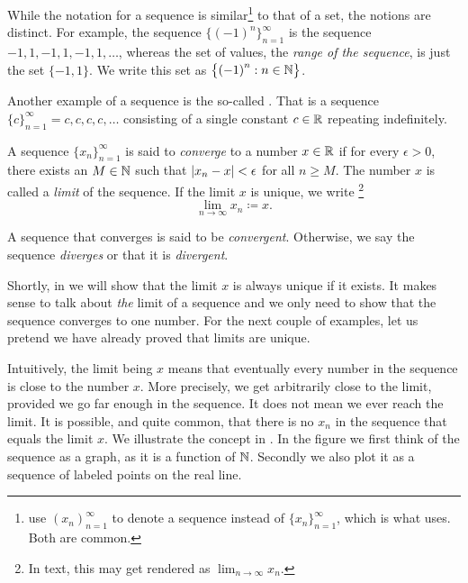 While the notation for a sequence
is similar\footnote{\cite{BS} use $(x_n)_{n=1}^\infty$ to denote
a sequence instead of $\{ x_n \}_{n=1}^\infty$, which is what \cite{Rudin:baby} uses.
Both are common.}
to that of a set, the notions are
distinct.  For example, the sequence $\bigl\{ {(-1)}^n \bigr\}_{n=1}^\infty$ is the sequence
$-1,1,-1,1,-1,1,\ldots$, whereas the set of values, the
\emph{range of the sequence},
is just the set $\{ -1, 1 \}$.  We write this set
as $\bigl\{ {(-1)}^n : n \in {\mathbb{N}} \bigr\}$.

Another example of a sequence is the so-called \emph{}.
That is a sequence $\{ c \}_{n=1}^\infty = c,c,c,c,\ldots$ consisting of a single
constant $c \in {\mathbb{R}}$ repeating indefinitely.


\begin{defn}
A sequence $\{ x_n \}_{n=1}^\infty$ is said to \emph{converge} to a number
$x \in {\mathbb{R}}$ if for every $\epsilon > 0$, there exists an $M \in {\mathbb{N}}$ such
that $\left\lvert {x_n - x} \right\rvert < \epsilon$ for all $n \geq M$.
The number $x$ is called a \emph{limit} of the sequence.
If the limit $x$ is unique, we write%
\footnote{In text, this may get rendered as $\lim_{n\to\infty} x_n$.}
%
\begin{equation*}
\lim_{n\to \infty} x_n \coloneqq x .
\end{equation*}

A sequence
that converges is said to be \emph{convergent}.
Otherwise, we say the sequence \emph{diverges}
or that it is
\emph{divergent}.
\end{defn}

Shortly, in  we will show that the limit $x$ is always
unique if it exists.  It makes sense to talk about \emph{the} limit of
a sequence and we only need to show that the sequence converges to one
number.
For the next couple of examples, let us pretend
we have already proved that limits are unique.

Intuitively, the limit being $x$ means that eventually
every number in the sequence is close to the number $x$.  More precisely,
we get arbitrarily close to the limit, provided we go far enough in the
sequence.  It does not mean we ever reach the limit.  It is possible,
and quite common, that there is no $x_n$ in the sequence that equals the
limit $x$.
We illustrate the concept in .  In the
figure we first think of the sequence as a graph, as it is a function of
${\mathbb{N}}$.   Secondly we also plot it as a sequence of labeled points on the real
line.

